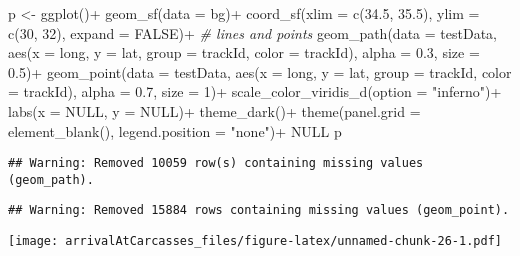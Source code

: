 \documentclass[
]{article}
\newenvironment{Shaded}{\begin{snugshade}}{\end{snugshade}}
\newcommand{\AttributeTok}[1]{\textcolor[rgb]{0.77,0.63,0.00}{#1}}
\newcommand{\CommentTok}[1]{\textcolor[rgb]{0.56,0.35,0.01}{\textit{#1}}}
\newcommand{\ConstantTok}[1]{\textcolor[rgb]{0.00,0.00,0.00}{#1}}
\newcommand{\DecValTok}[1]{\textcolor[rgb]{0.00,0.00,0.81}{#1}}
\newcommand{\FloatTok}[1]{\textcolor[rgb]{0.00,0.00,0.81}{#1}}
\newcommand{\FunctionTok}[1]{\textcolor[rgb]{0.00,0.00,0.00}{#1}}
\newcommand{\NormalTok}[1]{#1}
\newcommand{\OtherTok}[1]{\textcolor[rgb]{0.56,0.35,0.01}{#1}}
\newcommand{\SpecialCharTok}[1]{\textcolor[rgb]{0.00,0.00,0.00}{#1}}
\newcommand{\StringTok}[1]{\textcolor[rgb]{0.31,0.60,0.02}{#1}}
\begin{document}
\begin{Shaded}
\begin{Highlighting}[]
\NormalTok{p }\OtherTok{\textless{}{-}} \FunctionTok{ggplot}\NormalTok{()}\SpecialCharTok{+}
  \FunctionTok{geom\_sf}\NormalTok{(}\AttributeTok{data =}\NormalTok{ bg)}\SpecialCharTok{+}
  \FunctionTok{coord\_sf}\NormalTok{(}\AttributeTok{xlim =} \FunctionTok{c}\NormalTok{(}\FloatTok{34.5}\NormalTok{, }\FloatTok{35.5}\NormalTok{), }
           \AttributeTok{ylim =} \FunctionTok{c}\NormalTok{(}\DecValTok{30}\NormalTok{, }\DecValTok{32}\NormalTok{), }
           \AttributeTok{expand =} \ConstantTok{FALSE}\NormalTok{)}\SpecialCharTok{+}
  \CommentTok{\# lines and points}
  \FunctionTok{geom\_path}\NormalTok{(}\AttributeTok{data =}\NormalTok{ testData, }
            \FunctionTok{aes}\NormalTok{(}\AttributeTok{x =}\NormalTok{ long, }\AttributeTok{y =}\NormalTok{ lat, }\AttributeTok{group =}\NormalTok{ trackId, }\AttributeTok{color =}\NormalTok{ trackId), }
            \AttributeTok{alpha =} \FloatTok{0.3}\NormalTok{, }\AttributeTok{size =} \FloatTok{0.5}\NormalTok{)}\SpecialCharTok{+}
  \FunctionTok{geom\_point}\NormalTok{(}\AttributeTok{data =}\NormalTok{ testData, }
             \FunctionTok{aes}\NormalTok{(}\AttributeTok{x =}\NormalTok{ long, }\AttributeTok{y =}\NormalTok{ lat, }\AttributeTok{group =}\NormalTok{ trackId, }\AttributeTok{color =}\NormalTok{ trackId),}
             \AttributeTok{alpha =} \FloatTok{0.7}\NormalTok{, }\AttributeTok{size =} \DecValTok{1}\NormalTok{)}\SpecialCharTok{+}
  \FunctionTok{scale\_color\_viridis\_d}\NormalTok{(}\AttributeTok{option =} \StringTok{"inferno"}\NormalTok{)}\SpecialCharTok{+}
  \FunctionTok{labs}\NormalTok{(}\AttributeTok{x =} \ConstantTok{NULL}\NormalTok{, }\AttributeTok{y =} \ConstantTok{NULL}\NormalTok{)}\SpecialCharTok{+}
  \FunctionTok{theme\_dark}\NormalTok{()}\SpecialCharTok{+}
  \FunctionTok{theme}\NormalTok{(}\AttributeTok{panel.grid =} \FunctionTok{element\_blank}\NormalTok{(),}
        \AttributeTok{legend.position =} \StringTok{"none"}\NormalTok{)}\SpecialCharTok{+}
  \ConstantTok{NULL}
\NormalTok{p}
\end{Highlighting}
\end{Shaded}

\begin{verbatim}
## Warning: Removed 10059 row(s) containing missing values (geom_path).
\end{verbatim}

\begin{verbatim}
## Warning: Removed 15884 rows containing missing values (geom_point).
\end{verbatim}

\texttt{[image: arrivalAtCarcasses\_files/figure-latex/unnamed-chunk-26-1.pdf]}
\end{document}
